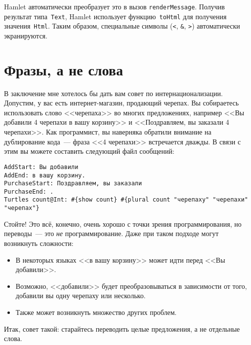 Hamlet автоматически преобразует это в вызов \lstinline'renderMessage'. Получив
результат типа~\lstinline'Text', Hamlet использует функцию~\lstinline'toHtml'
для получения значения~\lstinline'Html'. Таким образом, специальные символы
(\verb'<', \verb'&', \verb'>') автоматически экранируются.

\section{Фразы, а не слова}

В заключение мне хотелось бы дать вам совет по интернационализации. Допустим, у
вас есть интернет-магазин, продающий черепах. Вы собираетесь использовать слово
<<черепаха>> во многих предложениях, например <<Вы добавили 4 черепахи в вашу
корзину>> и <<Поздравляем, вы заказали 4 черепахи>>. Как программист, вы
наверняка обратили внимание на дублирование кода~--- фраза <<4 черепахи>>
встречается дважды. В связи с этим вы можете составить следующий файл
сообщений:

\begin{lstlisting}
AddStart: Вы добавили
AddEnd: в вашу корзину.
PurchaseStart: Поздравляем, вы заказали
PurchaseEnd: .
Turtles count@Int: #{show count} #{plural count "черепаху" "черепахи" "черепах"}
\end{lstlisting}

Стойте! Это всё, конечно, очень хорошо с точки зрения программирования, но
переводы~--- это \emph{не} программирование. Даже при таком подходе могут
возникнуть сложности:

\begin{itemize}
  \item В некоторых языках <<в вашу корзину>> может идти перед <<Вы добавили>>.

  \item Возможно, <<добавили>> будет преобразовываться в зависимости от того,
      добавили вы одну черепаху или несколько.

  \item Также может возникнуть множество других проблем.
\end{itemize}

Итак, совет такой: старайтесь переводить целые предложения, а не отдельные
слова.

